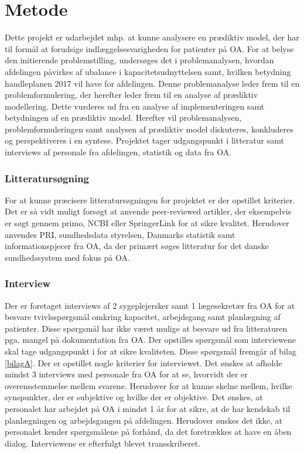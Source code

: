 \chapter{Metode}
Dette projekt er udarbejdet mhp. at kunne analysere en prædiktiv model, der har til formål at forudsige indlæggelsesvarigheden for patienter på OA. For at belyse den initierende problemstilling, undersøges det i problemanalysen, hvordan afdelingen påvirkes af ubalance i kapacitetsudnyttelsen samt, hvilken betydning handleplanen 2017 vil have for afdelingen. Denne problemanalyse leder frem til en problemformulering, der herefter leder frem til en analyse af prædiktiv modellering. Dette vurderes ud fra en analyse af implementeringen samt betydningen af en prædiktiv model. Herefter vil problemanalysen, problemformuleringen samt analysen af prædiktiv model diskuteres, konkluderes og perspektiveres i en syntese. Projektet tager udgangspunkt i litteratur samt interviews af personale fra afdelingen, statistik og data fra OA. 


\subsection{Litteratursøgning}
For at kunne præcisere litteratursøgningen for projektet er der opstillet kriterier. Det er så vidt muligt forsøgt at anvende peer-reviewed artikler, der eksempelvis er søgt gennem primo, NCBI eller SpringerLink for at sikre kvalitet. Herudover anvendes PRI, sundhedsdata styrelsen, Danmarks statistik samt informationspjecer fra OA, da der primært søges litteratur for det danske sundhedssystem med fokus på OA. 


\subsection{Interview}
Der er foretaget interviews af 2 sygeplejersker samt 1 lægesekretær fra OA for at besvare tvivlsspørgsmål omkring kapacitet, arbejdsgang samt planlægning af patienter. Disse spørgsmål har ikke været mulige at besvare ud fra litteraturen pga. mangel på dokumentation fra OA. Der opstilles spørgsmål som interviewene skal tage udgangspunkt i for at sikre kvaliteten. Disse spørgsmål fremgår af bilag \ref{bilagA}. Der er opstillet nogle kriterier for interviewet. Det ønskes at afholde mindst 3 interviews med personale fra OA for at se, hvorvidt der er overensstemmelse mellem svarene. Herudover for at kunne skelne mellem, hvilke synspunkter, der er subjektive og hvilke der er objektive. Det ønskes, at personalet har arbejdet på OA i mindst 1 år for at sikre, at de har kendskab til planlægningen og arbejdsgangen på afdelingen. Herudover ønskes det ikke, at personalet kender spørgsmålene på forhånd, da det foretrækkes at have en åben dialog. Interviewene er efterfulgt blevet transskriberet.


